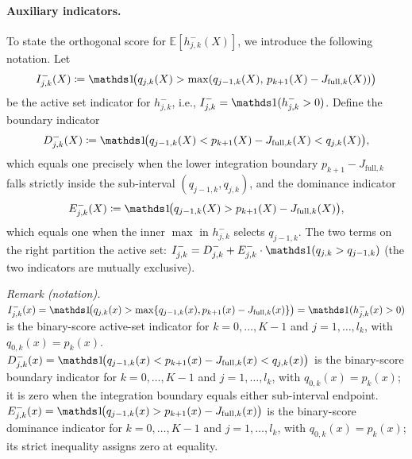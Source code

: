 \paragraph{Auxiliary indicators.} To state the orthogonal score for $\mathbb{E}[h_{j,k}^{-}(X)]$, we introduce the following notation. Let
\begin{equation*}
    I_{j,k}^{-}(X) \coloneqq \indicator\!\big(q_{j,k}(X) > \max(q_{j-1,k}(X),\, p_{k+1}(X) - J_{\text{full},k}(X))\big)
\end{equation*}
be the active set indicator for $h_{j,k}^{-}$, i.e., $I_{j,k}^{-} = \indicator(h_{j,k}^{-} > 0)$. Define the boundary indicator
\begin{equation*}
    D_{j,k}^{-}(X) \coloneqq \indicator\!\big(q_{j-1,k}(X) < p_{k+1}(X) - J_{\text{full},k}(X) < q_{j,k}(X)\big),
\end{equation*}
which equals one precisely when the lower integration boundary $p_{k+1} - J_{\text{full},k}$ falls strictly inside the sub-interval $(q_{j-1,k}, q_{j,k})$, and the dominance indicator
\begin{equation*}
    E_{j,k}^{-}(X) \coloneqq \indicator\!\big(q_{j-1,k}(X) > p_{k+1}(X) - J_{\text{full},k}(X)\big),
\end{equation*}
which equals one when the inner $\max$ in $h_{j,k}^{-}$ selects $q_{j-1,k}$. The two terms on the right partition the active set: $I_{j,k}^{-} = D_{j,k}^{-} + E_{j,k}^{-} \cdot \indicator(q_{j,k} > q_{j-1,k})$ (the two indicators are mutually exclusive).

\noindent\textit{Remark (notation).} $I_{j,k}^{-}(x)=\indicator\!\big(q_{j,k}(x)>\max\{q_{j-1,k}(x),p_{k+1}(x)-J_{\mathrm{full},k}(x)\}\big)=\indicator(h_{j,k}^{-}(x)>0)$ is the binary-score active-set indicator for $k=0,\ldots,K-1$ and $j=1,\ldots,l_k$, with $q_{0,k}(x)=p_k(x)$. $D_{j,k}^{-}(x)=\indicator\!\big(q_{j-1,k}(x)<p_{k+1}(x)-J_{\mathrm{full},k}(x)<q_{j,k}(x)\big)$ is the binary-score boundary indicator for $k=0,\ldots,K-1$ and $j=1,\ldots,l_k$, with $q_{0,k}(x)=p_k(x)$; it is zero when the integration boundary equals either sub-interval endpoint. $E_{j,k}^{-}(x)=\indicator\!\big(q_{j-1,k}(x)>p_{k+1}(x)-J_{\mathrm{full},k}(x)\big)$ is the binary-score dominance indicator for $k=0,\ldots,K-1$ and $j=1,\ldots,l_k$, with $q_{0,k}(x)=p_k(x)$; its strict inequality assigns zero at equality.


